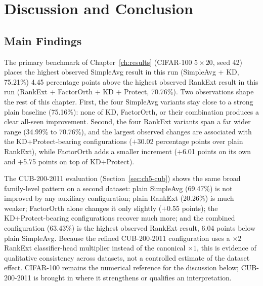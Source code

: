 
\chapter{Discussion and Conclusion}
\label{ch:discussion-conclusion}

\section{Main Findings}
\label{sec:ch6-main-findings}

The primary benchmark of Chapter~\ref{ch:results} (CIFAR-100 $5\times20$,
seed 42) places the highest observed SimpleAvg result in this run
(SimpleAvg + KD, 75.21\%) 4.45 percentage points above the highest observed
RankExt result in this run (RankExt + FactorOrth + KD + Protect, 70.76\%).
Two observations shape the rest of this chapter. First, the four SimpleAvg
variants stay close to a strong plain baseline (75.16\%): none of KD,
FactorOrth, or their combination produces a clear all-seen improvement.
Second, the four RankExt variants span a far wider range (34.99\% to
70.76\%), and the largest observed changes are associated with the
KD+Protect-bearing configurations ($+$30.02 percentage points over plain
RankExt), while FactorOrth adds a smaller increment ($+$6.01 points on its
own and $+$5.75 points on top of KD+Protect).

The CUB-200-2011 evaluation (Section~\ref{sec:ch5-cub}) shows the same
broad family-level pattern on a second dataset: plain SimpleAvg (69.47\%)
is not improved by any auxiliary configuration; plain RankExt (20.26\%) is
much weaker; FactorOrth alone changes it only slightly ($+$0.55 points);
the KD+Protect-bearing configurations recover much more; and the combined
configuration (63.43\%) is the highest observed RankExt result, 6.04 points
below plain SimpleAvg. Because the refined CUB-200-2011 configuration uses a
$\times2$ RankExt classifier-head multiplier instead of the canonical
$\times1$, this is evidence of qualitative consistency across datasets, not
a controlled estimate of the dataset effect. CIFAR-100 remains the
numerical reference for the discussion below; CUB-200-2011 is brought in
where it strengthens or qualifies an interpretation.

